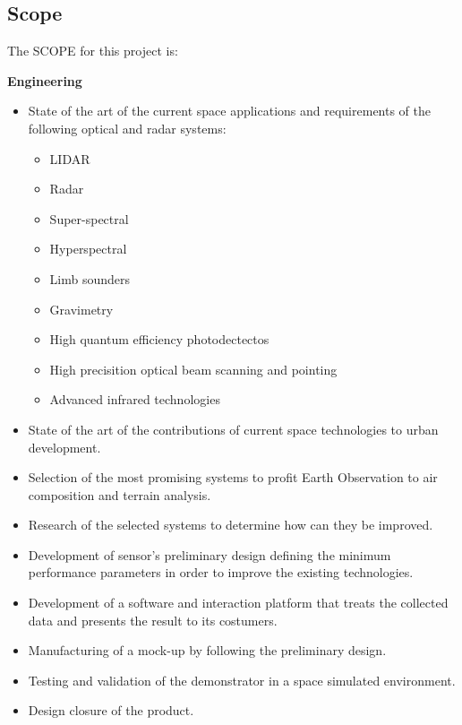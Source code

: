 \subsection{Scope}


The SCOPE for this project is:

{\bfseries Engineering} 
\begin{itemize}

	\item State of the art of the current space applications and requirements of the following optical and radar systems:

		\begin{itemize}

		\item LIDAR
		\item Radar
		\item Super-spectral
		\item Hyperspectral
		\item Limb sounders
		\item Gravimetry
		\item High quantum efficiency photodectectos
		\item High precisition optical beam scanning and pointing
		\item Advanced infrared technologies

		\end{itemize}

	\item State of the art of the contributions of current space technologies to urban development.

	\item Selection of the most promising systems to profit Earth Observation to air composition and terrain analysis.
	
	\item Research of the selected systems to determine how can they be improved. 
	
	\item Development of sensor's preliminary design defining the minimum performance parameters in order to improve the existing technologies.

	\item Development of a software and interaction platform that treats the collected data and presents the result to its costumers. 

	\item Manufacturing of a mock-up by following the preliminary design.

	\item Testing and validation of the demonstrator in a space simulated environment.

	\item Design closure of the product.

\end{itemize}

